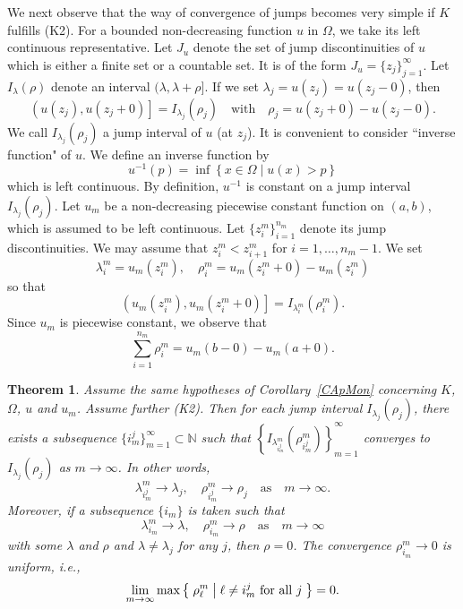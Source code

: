 \documentclass[12pt, reqno]{amsart}
\numberwithin{equation}{section}
\newtheorem{thm}{Theorem}[section]
\begin{document}
We next observe that the way of convergence of jumps becomes very simple if $K$ fulfills (K2).
 For a bounded non-decreasing function $u$ in $\Omega$, we take its left continuous representative.
 Let $J_u$ denote the set of jump discontinuities of $u$ which is either a finite set or a countable set.
 It is of the form $J_u=\{z_j\}_{j=1}^\infty$.
 Let $I_\lambda(\rho)$ denote an interval $(\lambda,\lambda+\rho]$.
 If we set $\lambda_j=u(z_j)=u(z_j-0)$, then
\[
    \left(u(z_j), u(z_j+0) \right]=I_{\lambda_j}(\rho_j)
    \quad\text{with}\quad
    \rho_j = u(z_j+0) - u(z_j-0).
\]
We call $I_{\lambda_j}(\rho_j)$ a jump interval of $u$ (at $z_j$).
 It is convenient to consider ``inverse function" of $u$.
 We define an inverse function by
\[
    u^{-1}(p) = \inf \left\{ x \in \Omega \mid
    u(x)> p \right\}
\]
which is left continuous.
 By definition, $u^{-1}$ is constant on a jump interval $I_{\lambda_j}(\rho_j)$.
 Let $u_m$ be a non-decreasing piecewise constant function on $(a,b)$, which is assumed to be left continuous.
 Let $\{z_i^m\}_{i=1}^{n_m}$ denote its jump discontinuities.
 We may assume that $z_i^m<z_{i+1}^m$ for $i=1,\ldots,n_m-1$.
 We set
\[
    \lambda_i^m = u_m(z_i^m), \quad
    \rho_i^m = u_m(z_i^m+0) - u_m(z_i^m)
\]
so that
\[
    \left(u_m(z_i^m), u_m(z_i^m+0) \right]
    = I_{\lambda_i^m} (\rho_i^m).
\]
Since $u_m$ is piecewise constant, we observe that
\[
    \sum_{i=1}^{n_m} \rho_i^m
    = u_m(b-0) - u_m(a+0).
\]
\begin{thm} \label{TCJ}
Assume the same hypotheses of Corollary~\ref{CApMon} concerning $K$, $\Omega$, $u$ and $u_m$.
 Assume further (K2).
 Then for each jump interval $I_{\lambda_j}(\rho_j)$, there exists a subsequence $\{i_m^j\}_{m=1}^\infty\subset\mathbb{N}$ such that $\left\{I_{\lambda_{i_m^j}^m}(\rho_{i_m^j}^m)\right\}_{m=1}^\infty$ converges to $I_{\lambda_j}(\rho_j)$ as $m\to\infty$.
 In other words,
\[
    \lambda_{i_m^j}^m \to \lambda_j, \quad
    \rho_{i_m^j}^m \to \rho_j
    \quad\text{as}\quad m \to \infty.
\]
Moreover, if a subsequence $\{i_m\}$ is taken such that
\[
    \lambda_{i_m}^m \to \lambda, \quad
    \rho_{i_m}^m \to \rho
    \quad\text{as}\quad m \to \infty
\]
with some $\lambda$ and $\rho$ and $\lambda\neq\lambda_j$ for any $j$, then $\rho=0$.
 The convergence $\rho_{i_m}^m\to0$ is uniform, i.e., 
\[
    \lim_{m\to\infty} \max \left\{\; \rho_\ell^m \bigm|
    \ell\neq i_m^j\ \text{for all}\ j\; \right\} = 0.
\] 
\end{thm}
\end{document}
